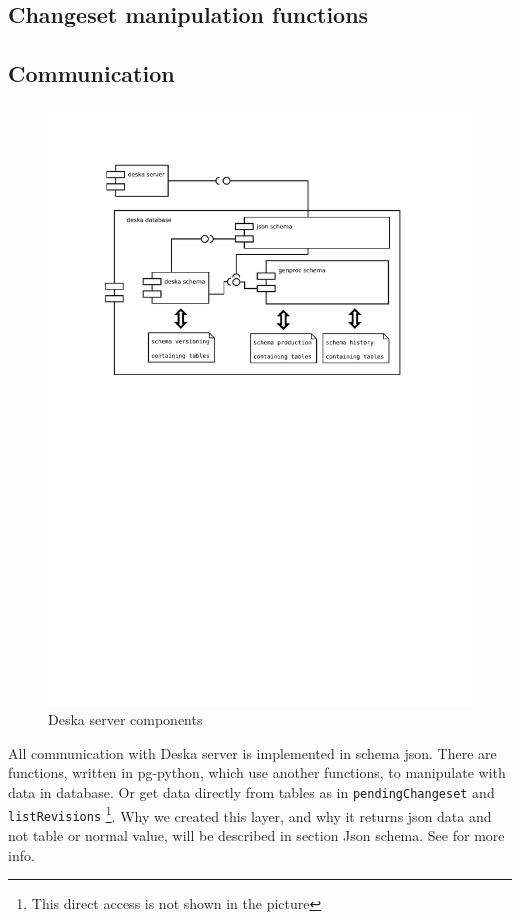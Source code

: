 \documentclass[deska]{subfiles}
\begin{document}
\subsection{Changeset manipulation functions}

\subsection{Communication}
\begin{figure}[h]
	\centering
	\label{img:deska-server}
	\includegraphics[trim=28mm 170mm 30mm 28mm]{img-deska-server-components.pdf}
	\caption{Deska server components}
\end{figure}

All communication with Deska server is implemented in schema json. There are functions, written in pg-python, which use another
functions, to manipulate with data in database. Or get data directly from tables as in {\tt pendingChangeset} and {\tt listRevisions}
\footnote{This direct access is not shown in the picture}.
Why we created this layer, and why it returns json data and not table or normal value, will be described in section Json schema.
See  for more info.
\end{document}
